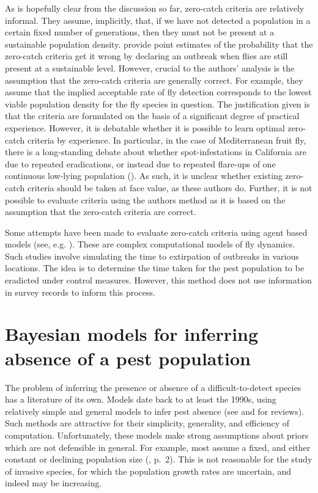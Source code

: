 \documentclass[
  oneside]{book}
\begin{document}
As is hopefully clear from the discussion so far, zero-catch criteria are relatively informal. They assume, implicitly, that, if we have not detected a population in a certain fixed number of generations, then they must not be present at a sustainable population density. \citet{meats2005} provide point estimates of the probability that the zero-catch criteria get it wrong by declaring an outbreak when flies are still present at a sustainable level. However, crucial to the authors' analysis is the assumption that the zero-catch criteria are generally correct. For example, they assume that the implied acceptable rate of fly detection corresponds to the lowest viable population density for the fly species in question. The justification given is that the criteria are formulated on the basis of a significant degree of practical experience. However, it is debatable whether it is possible to learn optimal zero-catch criteria by experience. In particular, in the case of Mediterranean fruit fly, there is a long-standing debate about whether spot-infestations in California are due to repeated eradications, or instead due to repeated flare-ups of one continuous low-lying population (\citet{carey2017}). As such, it is unclear whether existing zero-catch criteria should be taken at face value, as these authors do. Further, it is not possible to evaluate criteria using the authors method as it is based on the assumption that the zero-catch criteria are correct.

Some attempts have been made to evaluate zero-catch criteria using agent based models (see, e.g. \citet{collier2017}). These are complex computational models of fly dynamics. Such studies involve simulating the time to extirpation of outbreaks in various locations. The idea is to determine the time taken for the pest population to be eradicted under control measures. However, this method does not use information in survey records to inform this process.

\hypertarget{bayesian-models-for-inferring-absence-of-a-pest-population}{%
\section{Bayesian models for inferring absence of a pest population}\label{bayesian-models-for-inferring-absence-of-a-pest-population}}

The problem of inferring the presence or absence of a difficult-to-detect species has a literature of its own. Models date back to at least the 1990s, using relatively simple and general models to infer pest absence (see \citet{boakes2015} and \citet{caley2014} for reviews). Such methods are attractive for their simplicity, generality, and efficiency of computation. Unfortunately, these models make strong assumptions about priors which are not defensible in general. For example, most assume a fixed, and either constant or declining population size (\citet{caley2015}, p.~2). This is not reasonable for the study of invasive species, for which the population growth rates are uncertain, and indeed may be increasing.
\end{document}
